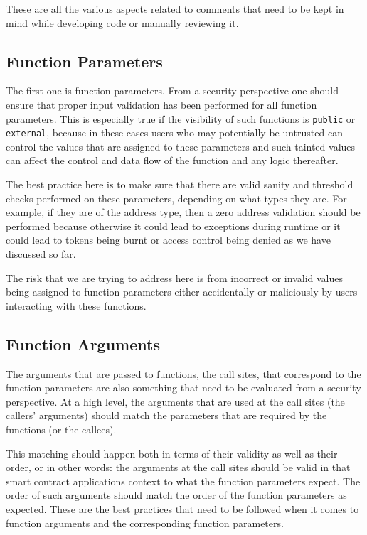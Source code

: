 These are all the various aspects related to comments that need to be
kept in mind while developing code or manually reviewing it.

\subsection{Function Parameters}\label{function-parameters}

The first one is function parameters. From a security perspective one
should ensure that proper input validation has been performed for all
function parameters. This is especially true if the visibility of such
functions is \texttt{public} or \texttt{external}, because in these
cases users who may potentially be untrusted can control the values that
are assigned to these parameters and such tainted values can affect the
control and data flow of the function and any logic thereafter.

The best practice here is to make sure that there are valid sanity and
threshold checks performed on these parameters, depending on what types
they are. For example, if they are of the address type, then a zero
address validation should be performed because otherwise it could lead
to exceptions during runtime or it could lead to tokens being burnt or
access control being denied as we have discussed so far.

The risk that we are trying to address here is from incorrect or invalid
values being assigned to function parameters either accidentally or
maliciously by users interacting with these functions.

\subsection{Function Arguments}\label{function-arguments}

The arguments that are passed to functions, the call sites, that
correspond to the function parameters are also something that need to be
evaluated from a security perspective. At a high level, the arguments
that are used at the call sites (the callers' arguments) should match
the parameters that are required by the functions (or the callees).

This matching should happen both in terms of their validity as well as
their order, or in other words: the arguments at the call sites should
be valid in that smart contract applications context to what the
function parameters expect. The order of such arguments should match the
order of the function parameters as expected. These are the best
practices that need to be followed when it comes to function arguments
and the corresponding function parameters.

